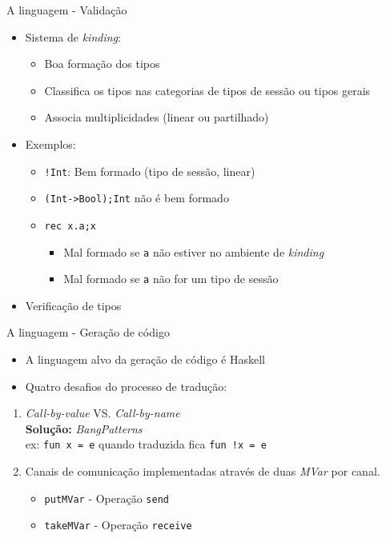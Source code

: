 \begin{frame}[fragile]{A linguagem - Validação}
  \begin{itemize}
  \item Sistema de \textit{kinding}:
    \begin{itemize}
    \item Boa formação dos tipos
    \item Classifica os tipos nas categorias de tipos de sessão ou tipos gerais
    \item Associa multiplicidades (linear ou partilhado)
    \end{itemize}
  \item Exemplos:
    \begin{itemize}
    \item \lstinline|!Int|: Bem formado (tipo de sessão, linear) %
    \item \lstinline|(Int->Bool);Int| não é bem formado
    \item \lstinline|rec x.a;x|
      \begin{itemize}
      \item Mal formado se \lstinline|a| não estiver no ambiente de \textit{kinding}
      \item Mal formado se \lstinline|a| não for um tipo de sessão
      \end{itemize}
    \end{itemize}
    
  \item Verificação de tipos
  \end{itemize}
\end{frame}
  
\begin{frame}[fragile]{A linguagem - Geração de código}
  \begin{itemize}
  \item A linguagem alvo da geração de código é Haskell
  \item Quatro desafios do processo de tradução:
  \end{itemize}
  \begin{enumerate}
    \item \textit{Call-by-value} VS. \textit{Call-by-name}\\
      \textbf{Solução:} \textit{BangPatterns}\\      
      ex: \lstinline|fun x = e| quando traduzida fica \lstinline|fun !x = e|
   \newline
 \item Canais de comunicação implementadas através de duas \textit{MVar} por canal.
   \begin{itemize}
   \item \lstinline[Haskell]|putMVar| - Operação \lstinline|send|
   \item \lstinline[Haskell]|takeMVar| - Operação \lstinline|receive|
   \end{itemize}
  \end{enumerate}

\end{frame}


